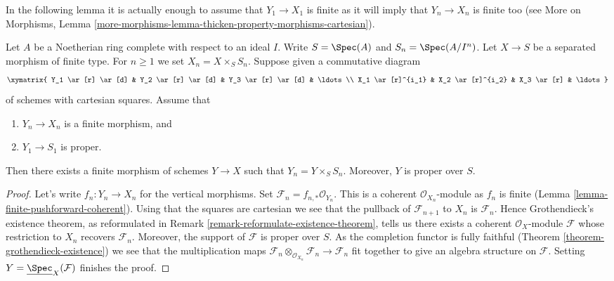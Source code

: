 \noindent
In the following lemma it is actually enough to assume that $Y_1 \to X_1$
is finite as it will imply that $Y_n \to X_n$ is finite too
(see More on Morphisms, Lemma
\ref{more-morphisms-lemma-thicken-property-morphisms-cartesian}).

\begin{lemma}
\label{lemma-algebraize-formal-scheme-finite-over-proper}
Let $A$ be a Noetherian ring complete with respect to an ideal $I$.
Write $S = \Spec(A)$ and $S_n = \Spec(A/I^n)$.
Let $X \to S$ be a separated morphism of finite type.
For $n \geq 1$ we set $X_n = X \times_S S_n$.
Suppose given a commutative diagram
$$
\xymatrix{
Y_1 \ar[r] \ar[d] & Y_2 \ar[r] \ar[d] & Y_3 \ar[r] \ar[d] & \ldots \\
X_1 \ar[r]^{i_1} & X_2 \ar[r]^{i_2} & X_3 \ar[r] & \ldots
}
$$
of schemes with cartesian squares. Assume that
\begin{enumerate}
\item $Y_n \to X_n$ is a finite morphism, and
\item $Y_1 \to S_1$ is proper.
\end{enumerate}
Then there exists a finite morphism of schemes $Y \to X$ such that
$Y_n = Y \times_S S_n$. Moreover, $Y$ is proper over $S$.
\end{lemma}

\begin{proof}
Let's write $f_n : Y_n \to X_n$ for the vertical morphisms.
Set $\mathcal{F}_n = f_{n, *}\mathcal{O}_{Y_n}$. This is
a coherent $\mathcal{O}_{X_n}$-module as $f_n$ is finite
(Lemma \ref{lemma-finite-pushforward-coherent}).
Using that the squares are cartesian we see that
the pullback of $\mathcal{F}_{n + 1}$ to $X_n$ is $\mathcal{F}_n$.
Hence Grothendieck's existence theorem, as reformulated in
Remark \ref{remark-reformulate-existence-theorem},
tells us there exists a coherent $\mathcal{O}_X$-module
$\mathcal{F}$ whose restriction to $X_n$ recovers $\mathcal{F}_n$.
Moreover, the support of $\mathcal{F}$ is proper over $S$.
As the completion functor is fully faithful
(Theorem \ref{theorem-grothendieck-existence})
we see that the multiplication maps
$\mathcal{F}_n \otimes_{\mathcal{O}_{X_n}} \mathcal{F}_n \to
\mathcal{F}_n$ fit together to give an algebra structure on $\mathcal{F}$.
Setting $Y = \underline{\Spec}_X(\mathcal{F})$ finishes the proof.
\end{proof}

